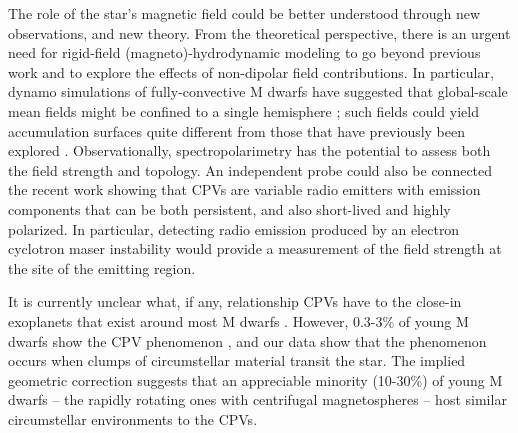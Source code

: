 \documentclass{nature3}
\begin{document}
The role of the star's magnetic field could be better understood
through new observations, and new theory.  From the theoretical
perspective, there is an urgent need for rigid-field
(magneto)-hydrodynamic modeling to go beyond previous work
\cite{Townsend2005,Townsend2008} and to explore the effects of
non-dipolar field contributions.
In particular, dynamo simulations of fully-convective M dwarfs have
suggested that global-scale mean fields might be
confined to a single hemisphere \cite{Brown2020}; such fields could
yield accumulation surfaces quite different
from those that have previously been explored \cite{Townsend2008}.
Observationally, spectropolarimetry has the potential to
assess both the field strength and topology.  An independent
probe could also be connected the recent work \cite{Kaur2024} showing
that CPVs are variable radio emitters with emission components
that can be both persistent, and also short-lived and highly
polarized.  In particular, detecting radio emission produced by an electron
cyclotron maser instability would provide a measurement of the field
strength at the site of the emitting region.

It is currently unclear what, if any, relationship CPVs have to the
close-in exoplanets that exist around most M dwarfs
\cite{Dressing2015}.  However, 0.3-3\% of young M dwarfs show the CPV
phenomenon \cite{Rebull2020}, and our data show that the phenomenon
occurs when clumps of circumstellar material transit the star.  The
implied geometric correction suggests that an appreciable minority
(10-30\%) of young M dwarfs -- the rapidly rotating ones with
centrifugal magnetospheres -- host similar circumstellar environments
to the CPVs.




\end{document}
